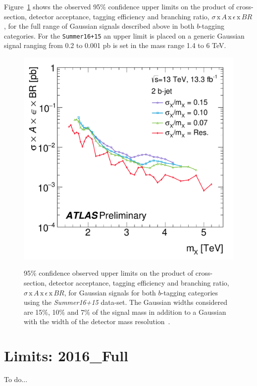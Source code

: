 Figure~\ref{fig:lim-summer_gauss} shows the observed 95\% confidence upper limits
on the product of cross-section, detector acceptance, tagging efficiency and branching ratio,
$\sigma\,\text{x}\,\mathit{A}\,\text{x}\,\epsilon\,\text{x}\,\mathit{BR}$,
for the full range of Gaussian signals described above in both $b$-tagging categories.
For the \verb|Summer16+15| an upper limit is placed on a generic Gaussian signal
ranging from 0.2 to 0.001 pb is set in the mass range 1.4 to 6 TeV.

\begin{figure}[!ht]
  \begin{center}
    \captionsetup[subfigure]{aboveskip=0pt,justification=centering}
         {\includegraphics[width=0.47\linewidth, angle=0]{figs/Dibjet/ICHEP/lim-summer_gauss_bb.pdf}}
  \end{center}
  \caption[95\% confidence observed upper limits
    on the product of cross-section, detector acceptance, tagging efficiency and branching ratio,
    $\sigma\,\text{x}\,\mathit{A}\,\text{x}\,\epsilon\,\text{x}\,\mathit{BR}$,
    for Gaussian signals for both $b$-tagging categories using the \textit{Summer16+15} data-set.
    The Gaussian widths considered are 15\%, 10\% and 7\% of the signal mass
    in addition to a Gaussian with the width of the detector mass resolution.]
  {95\% confidence observed upper limits
    on the product of cross-section, detector acceptance, tagging efficiency and branching ratio,
    $\sigma\,\text{x}\,\mathit{A}\,\text{x}\,\epsilon\,\text{x}\,\mathit{BR}$,
    for Gaussian signals for both $b$-tagging categories using the \textit{Summer16+15} data-set.
    The Gaussian widths considered are 15\%, 10\% and 7\% of the signal mass
    in addition to a Gaussian with the width of the detector mass resolution~\cite{dibjet-ichep_conf}.
  }
  \label{fig:lim-summer_gauss}
\end{figure}

\FloatBarrier

\section{Limits: 2016\_Full}
\label{sec:lim-full}

To do... 
